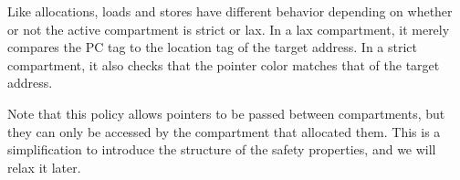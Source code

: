 \documentclass{article}
\begin{document}
\begin{minipage}{0.29\textwidth}

\end{minipage}

Like allocations, loads and stores have different behavior depending on whether or not the active
compartment is strict or lax. In a lax compartment, it merely compares the PC tag to the location
tag of the target address. In a strict compartment, it also checks that the pointer color matches
that of the target address.

\hspace{-5em}
\begin{minipage}{0.55\textwidth}
\end{minipage}
\begin{minipage}{0.44\textwidth}
\end{minipage}

Note that this policy allows pointers to be passed between compartments, but they can only
be accessed by the compartment that allocated them. This is a simplification to introduce
the structure of the safety properties, and we will relax it later.
\end{document}

